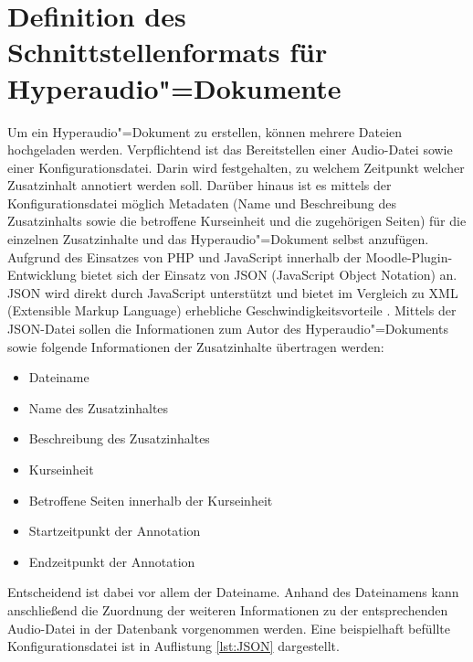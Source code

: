 \section{Definition des Schnittstellenformats für Hyperaudio"=Dokumente}
\label{sec:konfigurationsdatei}
Um ein Hyperaudio"=Dokument zu erstellen, können mehrere Dateien hochgeladen werden. Verpflichtend ist das Bereitstellen einer Audio-Datei sowie einer Konfigurationsdatei. Darin wird festgehalten, zu welchem Zeitpunkt welcher Zusatzinhalt annotiert werden soll. Darüber hinaus ist es mittels der Konfigurationsdatei möglich Metadaten (Name und Beschreibung des Zusatzinhalts sowie die betroffene Kurseinheit und die zugehörigen Seiten) für die einzelnen Zusatzinhalte und das Hyperaudio"=Dokument selbst anzufügen.
Aufgrund des Einsatzes von PHP und JavaScript innerhalb der Moodle-Plugin-Entwicklung bietet sich der Einsatz von JSON (JavaScript Object Notation) an. JSON wird direkt durch JavaScript unterstützt und bietet im Vergleich zu XML (Extensible Markup Language) erhebliche Geschwindigkeitsvorteile \citep{nurseitov2009comparison}.
Mittels der JSON-Datei sollen die Informationen zum Autor des Hyperaudio"=Dokuments sowie folgende Informationen der Zusatzinhalte übertragen werden:

\begin{itemize}
\item Dateiname
\item Name des Zusatzinhaltes
\item Beschreibung des Zusatzinhaltes
\item Kurseinheit
\item Betroffene Seiten innerhalb der Kurseinheit
\item Startzeitpunkt der Annotation
\item Endzeitpunkt der Annotation
\end{itemize}

Entscheidend ist dabei vor allem der Dateiname. Anhand des Dateinamens kann anschließend die Zuordnung der weiteren Informationen zu der entsprechenden Audio-Datei in der Datenbank vorgenommen werden. Eine beispielhaft befüllte Konfigurationsdatei ist in Auflistung \ref{lst:JSON} dargestellt. 

